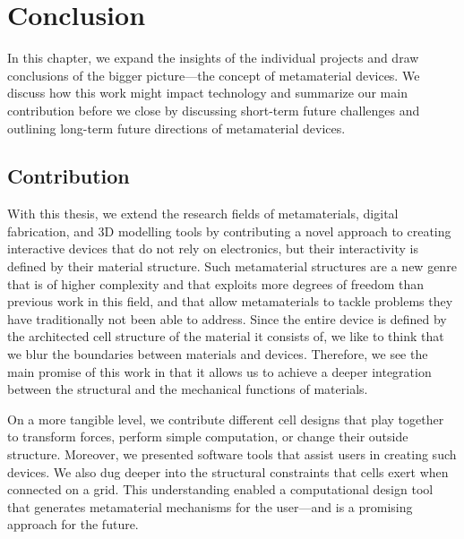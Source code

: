\chapter{Conclusion}
\label{chapter:conclusion}

In this chapter, we expand the insights of the individual projects and draw conclusions of the bigger picture---the concept of metamaterial devices. We discuss how this work might impact technology and summarize our main contribution before we close by discussing short-term future challenges and outlining long-term future directions of metamaterial devices.



\section{Contribution}

With this thesis, we extend the research fields of metamaterials, digital fabrication, and 3D modelling tools by contributing a novel approach to creating interactive devices that do not rely on electronics, but their interactivity is defined by their material structure. Such metamaterial structures are a new genre that is of higher complexity and that exploits more degrees of freedom than previous work in this field, and that allow metamaterials to tackle problems they have traditionally not been able to address. Since the entire device is defined by the architected cell structure of the material it consists of, we like to think that we blur the boundaries between materials and devices. Therefore, we see the main promise of this work in that it allows us to achieve a deeper integration between the structural and the mechanical functions of materials.

On a more tangible level, we contribute different cell designs that play together to transform forces, perform simple computation, or change their outside structure. Moreover, we presented software tools that assist users in creating such devices. We also dug deeper into the structural constraints that cells exert when connected on a grid. This understanding enabled a computational design tool that generates metamaterial mechanisms for the user---and is a promising approach for the future.




